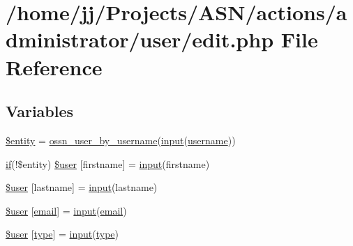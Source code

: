 \hypertarget{actions_2administrator_2user_2edit_8php}{}\section{/home/jj/\+Projects/\+A\+S\+N/actions/administrator/user/edit.php File Reference}
\label{actions_2administrator_2user_2edit_8php}
\subsection*{Variables}
\begin{DoxyCompactItemize}
\item 
\hyperlink{actions_2administrator_2user_2edit_8php_a74ed34e6d7bc9f3f8c4fb58a12247ee2}{\$entity} = \hyperlink{ossn_8lib_8users_8php_a77fdcb678aedd165af1f9f875645c864}{ossn\+\_\+user\+\_\+by\+\_\+username}(\hyperlink{ossn_8lib_8input_8php_a64ebee98b041c4f75f71ed3cd73cc8ed}{input}(\textquotesingle{}\hyperlink{actions_2account_8php_ac9b3768ccc688c2ff0811c50c107a02e}{username}\textquotesingle{}))
\item 
\hyperlink{jquery_8tokeninput_8js_ad8dd46a3cbc004569e34401e9e71771a}{if}(!\$entity) \hyperlink{actions_2administrator_2user_2edit_8php_aac0a0d9be0cd7bff33c25dc23bc48f69}{\$user} \mbox{[}\textquotesingle{}firstname\textquotesingle{}\mbox{]} = \hyperlink{ossn_8lib_8input_8php_a64ebee98b041c4f75f71ed3cd73cc8ed}{input}(\textquotesingle{}firstname\textquotesingle{})
\item 
\hyperlink{actions_2administrator_2user_2edit_8php_a1187774c6d9942181216e0839e5e73bc}{\$user} \mbox{[}\textquotesingle{}lastname\textquotesingle{}\mbox{]} = \hyperlink{ossn_8lib_8input_8php_a64ebee98b041c4f75f71ed3cd73cc8ed}{input}(\textquotesingle{}lastname\textquotesingle{})
\item 
\hyperlink{actions_2administrator_2user_2edit_8php_ae9de5cc5ae3fec81bb110d3a77ad7eec}{\$user} \mbox{[}\textquotesingle{}\hyperlink{actions_2account_8php_a011c66ae212438e0d7de7c0e40451bb3}{email}\textquotesingle{}\mbox{]} = \hyperlink{ossn_8lib_8input_8php_a64ebee98b041c4f75f71ed3cd73cc8ed}{input}(\textquotesingle{}\hyperlink{actions_2account_8php_a011c66ae212438e0d7de7c0e40451bb3}{email}\textquotesingle{})
\item 
\hyperlink{actions_2administrator_2user_2edit_8php_a2cd01208f5982178bbb0d42917960662}{\$user} \mbox{[}\textquotesingle{}\hyperlink{_ossn_wall_2actions_2wall_2post_2group_8php_a2dc1bb4e1ed0029daa81ac0776b14b51}{type}\textquotesingle{}\mbox{]} = \hyperlink{ossn_8lib_8input_8php_a64ebee98b041c4f75f71ed3cd73cc8ed}{input}(\textquotesingle{}\hyperlink{_ossn_wall_2actions_2wall_2post_2group_8php_a2dc1bb4e1ed0029daa81ac0776b14b51}{type}\textquotesingle{})

\end{DoxyCompactItemize}
